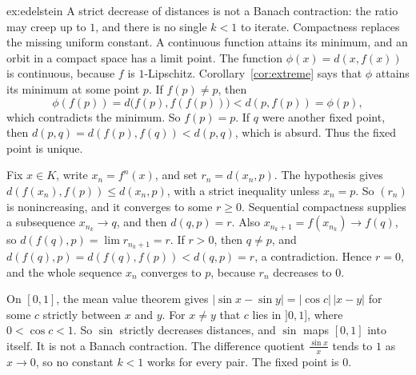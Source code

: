 \begin{solution}{ex:edelstein}
\idea A strict decrease of distances is not a Banach contraction: the ratio may creep up to $1$, and there is no single $k<1$ to iterate. Compactness replaces the missing uniform constant. A continuous function attains its minimum, and an orbit in a compact space has a limit point.
\writeup The function $\phi(x)=d(x,f(x))$ is continuous, because $f$ is $1$-Lipschitz. Corollary~\ref{cor:extreme} says that $\phi$ attains its minimum at some point $p$. If $f(p)\ne p$, then
\[\phi(f(p))=d\bigl(f(p),f(f(p))\bigr)<d(p,f(p))=\phi(p),\]
which contradicts the minimum. So $f(p)=p$. If $q$ were another fixed point, then $d(p,q)=d(f(p),f(q))<d(p,q)$, which is absurd. Thus the fixed point is unique.

Fix $x\in K$, write $x_n=f^n(x)$, and set $r_n=d(x_n,p)$. The hypothesis gives $d(f(x_n),f(p))\le d(x_n,p)$, with a strict inequality unless $x_n=p$. So $(r_n)$ is nonincreasing, and it converges to some $r\ge0$. Sequential compactness supplies a subsequence $x_{n_k}\to q$, and then $d(q,p)=r$. Also $x_{n_k+1}=f(x_{n_k})\to f(q)$, so $d(f(q),p)=\lim r_{n_k+1}=r$. If $r>0$, then $q\ne p$, and $d(f(q),p)=d(f(q),f(p))<d(q,p)=r$, a contradiction. Hence $r=0$, and the whole sequence $x_n$ converges to $p$, because $r_n$ decreases to $0$.

On $[0,1]$, the mean value theorem gives $|\sin x-\sin y|=|\cos c|\,|x-y|$ for some $c$ strictly between $x$ and $y$. For $x\ne y$ that $c$ lies in $]0,1]$, where $0<\cos c<1$. So $\sin$ strictly decreases distances, and $\sin$ maps $[0,1]$ into itself. It is not a Banach contraction. The difference quotient $\frac{\sin x}x$ tends to $1$ as $x\to0$, so no constant $k<1$ works for every pair. The fixed point is $0$.
\end{solution}

